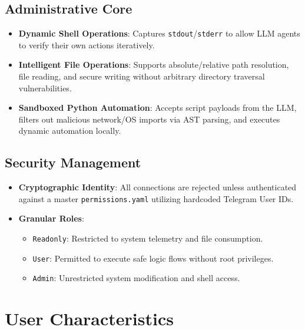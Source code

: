 \documentclass{scrreprt}
\begin{document}
\subsection{Administrative Core}
\begin{itemize}
    \item \textbf{Dynamic Shell Operations}: Captures \texttt{stdout}/\texttt{stderr} to allow LLM agents to verify their own actions iteratively.
    \item \textbf{Intelligent File Operations}: Supports absolute/relative path resolution, file reading, and secure writing without arbitrary directory traversal vulnerabilities.
    \item \textbf{Sandboxed Python Automation}: Accepts script payloads from the LLM, filters out malicious network/OS imports via AST parsing, and executes dynamic automation locally.
\end{itemize}

\subsection{Security Management}
\begin{itemize}
    \item \textbf{Cryptographic Identity}: All connections are rejected unless authenticated against a master \texttt{permissions.yaml} utilizing hardcoded Telegram User IDs.
    \item \textbf{Granular Roles}:
    \begin{itemize}
        \item \texttt{Readonly}: Restricted to system telemetry and file consumption.
        \item \texttt{User}: Permitted to execute safe logic flows without root privileges.
        \item \texttt{Admin}: Unrestricted system modification and shell access.
    \end{itemize}
\end{itemize}

\section{User Characteristics}
\label{sec:user-characteristics}
\end{document}
